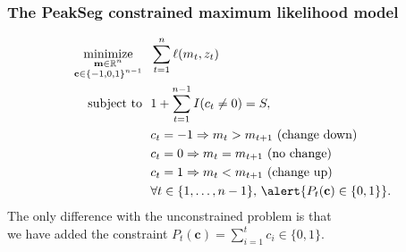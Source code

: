 \documentclass{beamer}
\DeclareMathOperator*{\minimize}{minimize}
\newcommand{\RR}{\mathbb R}
\begin{document}

\begin{frame}
  \frametitle{The PeakSeg constrained maximum likelihood model}
\begin{align*}
    \minimize_{\substack{
  \mathbf m\in\RR^{n}
\\
  \mathbf c\in\{-1,0,1\}^{n-1}
  }} &\ \ 
    \sum_{t=1}^n \ell( m_t,  z_t) \\
    \text{subject to} &\ \  1+\sum_{t=1}^{n-1} I(c_t \neq 0) = S, \\
& \ \ c_t = -1 \Rightarrow m_{t} > m_{t+1} \text{ (change down)}\\
& \ \ c_t = 0 \Rightarrow m_{t} = m_{t+1}  \text{ (no change)}\\
& \ \ c_t = 1 \Rightarrow m_{t} < m_{t+1} \text{ (change up)}\\
&\ \ \forall t\in\{1, \dots, n-1\},\, \alert{P_t(\mathbf c) \in\{0, 1\}}.
\end{align*}
The only difference with the unconstrained problem is that\\
\alert{we
have added the constraint $P_t(\mathbf c)=\sum_{i=1}^t c_i \in\{0, 1\}$}.
\end{frame}
\end{document}
